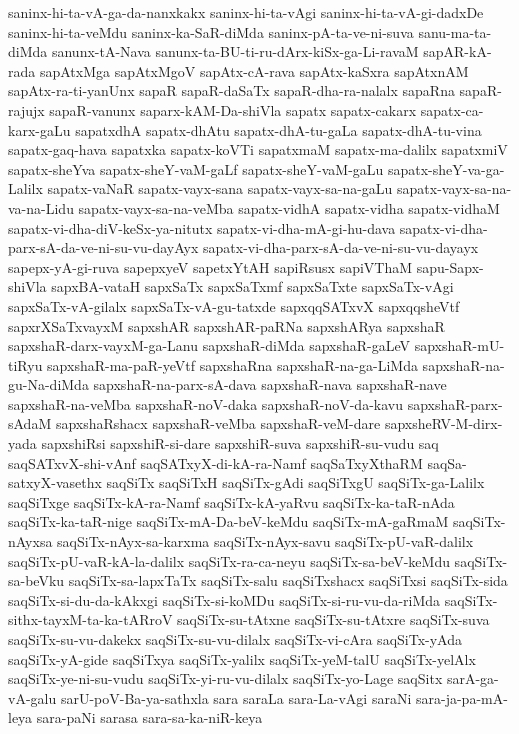 {saninx-hi-ta-vA-ga-da-nanxkakx
saninx-hi-ta-vAgi
saninx-hi-ta-vA-gi-dadxDe
saninx-hi-ta-veMdu
saninx-ka-SaR-diMda
saninx-pA-ta-ve-ni-suva
sanu-ma-ta-diMda
sanunx-tA-Nava
sanunx-ta-BU-ti-ru-dArx-kiSx-ga-Li-ravaM
sapAR-kA-rada
sapAtxMga
sapAtxMgoV
sapAtx-cA-rava
sapAtx-kaSxra
sapAtxnAM
sapAtx-ra-ti-yanUnx
sapaR
sapaR-daSaTx
sapaR-dha-ra-nalalx
sapaRna
sapaR-rajujx
sapaR-vanunx
saparx-kAM-Da-shiVla
sapatx
sapatx-cakarx
sapatx-ca-karx-gaLu
sapatxdhA
sapatx-dhAtu
sapatx-dhA-tu-gaLa
sapatx-dhA-tu-vina
sapatx-gaq-hava
sapatxka
sapatx-koVTi
sapatxmaM
sapatx-ma-dalilx
sapatxmiV
sapatx-sheYva
sapatx-sheY-vaM-gaLf
sapatx-sheY-vaM-gaLu
sapatx-sheY-va-ga-Lalilx
sapatx-vaNaR
sapatx-vayx-sana
sapatx-vayx-sa-na-gaLu
sapatx-vayx-sa-na-va-na-Lidu
sapatx-vayx-sa-na-veMba
sapatx-vidhA
sapatx-vidha
sapatx-vidhaM
sapatx-vi-dha-diV-keSx-ya-nitutx
sapatx-vi-dha-mA-gi-hu-dava
sapatx-vi-dha-parx-sA-da-ve-ni-su-vu-dayAyx
sapatx-vi-dha-parx-sA-da-ve-ni-su-vu-dayayx
sapepx-yA-gi-ruva
sapepxyeV
sapetxYtAH
sapiRsusx
sapiVThaM
sapu-Sapx-shiVla
sapxBA-vataH
sapxSaTx
sapxSaTxmf
sapxSaTxte
sapxSaTx-vAgi
sapxSaTx-vA-gilalx
sapxSaTx-vA-gu-tatxde
sapxqqSATxvX
sapxqqsheVtf
sapxrXSaTxvayxM
sapxshAR
sapxshAR-paRNa
sapxshARya
sapxshaR
sapxshaR-darx-vayxM-ga-Lanu
sapxshaR-diMda
sapxshaR-gaLeV
sapxshaR-mU-tiRyu
sapxshaR-ma-paR-yeVtf
sapxshaRna
sapxshaR-na-ga-LiMda
sapxshaR-na-gu-Na-diMda
sapxshaR-na-parx-sA-dava
sapxshaR-nava
sapxshaR-nave
sapxshaR-na-veMba
sapxshaR-noV-daka
sapxshaR-noV-da-kavu
sapxshaR-parx-sAdaM
sapxshaRshacx
sapxshaR-veMba
sapxshaR-veM-dare
sapxsheRV-M-dirx-yada
sapxshiRsi
sapxshiR-si-dare
sapxshiR-suva
sapxshiR-su-vudu
saq
saqSATxvX-shi-vAnf
saqSATxyX-di-kA-ra-Namf
saqSaTxyXthaRM
saqSa-satxyX-vasethx
saqSiTx
saqSiTxH
saqSiTx-gAdi
saqSiTxgU
saqSiTx-ga-Lalilx
saqSiTxge
saqSiTx-kA-ra-Namf
saqSiTx-kA-yaRvu
saqSiTx-ka-taR-nAda
saqSiTx-ka-taR-nige
saqSiTx-mA-Da-beV-keMdu
saqSiTx-mA-gaRmaM
saqSiTx-nAyxsa
saqSiTx-nAyx-sa-karxma
saqSiTx-nAyx-savu
saqSiTx-pU-vaR-dalilx
saqSiTx-pU-vaR-kA-la-dalilx
saqSiTx-ra-ca-neyu
saqSiTx-sa-beV-keMdu
saqSiTx-sa-beVku
saqSiTx-sa-lapxTaTx
saqSiTx-salu
saqSiTxshacx
saqSiTxsi
saqSiTx-sida
saqSiTx-si-du-da-kAkxgi
saqSiTx-si-koMDu
saqSiTx-si-ru-vu-da-riMda
saqSiTx-sithx-tayxM-ta-ka-tARroV
saqSiTx-su-tAtxne
saqSiTx-su-tAtxre
saqSiTx-suva
saqSiTx-su-vu-dakekx
saqSiTx-su-vu-dilalx
saqSiTx-vi-cAra
saqSiTx-yAda
saqSiTx-yA-gide
saqSiTxya
saqSiTx-yalilx
saqSiTx-yeM-talU
saqSiTx-yelAlx
saqSiTx-ye-ni-su-vudu
saqSiTx-yi-ru-vu-dilalx
saqSiTx-yo-Lage
saqSitx
sarA-ga-vA-galu
sarU-poV-Ba-ya-sathxla
sara
saraLa
sara-La-vAgi
saraNi
sara-ja-pa-mA-leya
sara-paNi
sarasa
sara-sa-ka-niR-keya
}
